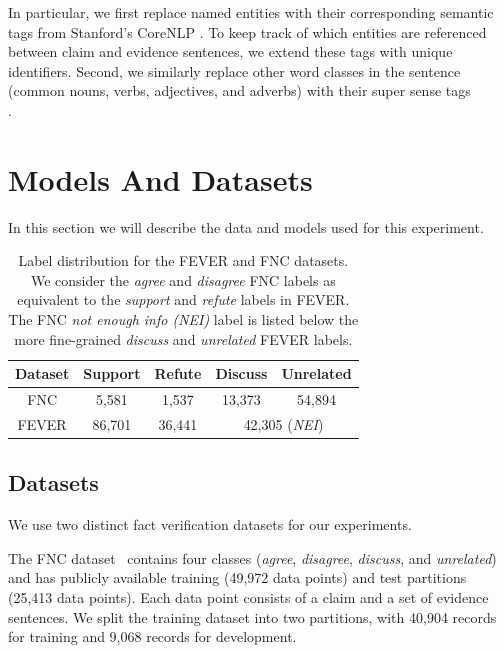 In particular, we first replace named entities with their corresponding semantic tags from Stanford's CoreNLP \citep{manning2014stanford}.
To keep track of which entities are referenced between claim and evidence sentences, we extend these tags with unique identifiers.
%
Second, we similarly replace other word classes in the sentence (common nouns, verbs, adjectives, and adverbs)  with their super sense tags \citep{ciaramita2003supersense}\\.



\section{Models And Datasets}
\label{sec-emnlp2019:models}

In this section we will describe the data and models used for this experiment.

\begin{table}
    \centering
    \footnotesize
    \begin{tabular}{ccccc}
        Dataset & Support & Refute & Discuss & Unrelated \\
        \hline
        FNC    & 5,581 & 1,537  & 13,373 & 54,894 \\
        FEVER  &  86,701 & 36,441  & \multicolumn{2}{c}{42,305 (\textit{NEI})} \\
    \end{tabular}
    \caption{Label distribution for the FEVER and FNC datasets.  We consider the \textit{agree} and \textit{disagree} FNC labels as equivalent to the \textit{support} and \textit{refute} labels in FEVER. The FNC \textit{not enough info (NEI)} label is listed below the more fine-grained \textit{discuss} and \textit{unrelated} FEVER labels.  }
    \label{tab:data}
\end{table}

\subsection{Datasets}
We use two distinct fact verification datasets for our experiments.

{}
The FNC dataset~\citep{pomerleau2017fake} contains four classes (\textit{agree}, \textit{disagree}, \textit{discuss}, and \textit{unrelated}) and has publicly available training (49,972 data points) and test partitions (25,413 data points). Each data point consists of a claim and a set of evidence sentences.  We split the training dataset into two partitions, with 40,904 records for training and 9,068 records for development.




